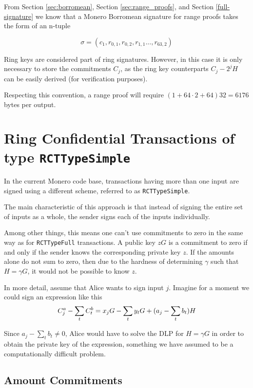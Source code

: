 From Section \ref{sec:borromean}, Section \ref{sec:range_proofs}, and Section \ref{full-signature} we know that a Monero Borromean signature for range proofs takes the form of an n-tuple

\[\sigma = (c_1, r_{0, 1}, r_{0, 2}, r_{1, 1}..., r_{63, 2} )  \]

Ring keys are considered part of ring signatures. However, in this case it is only necessary to store the commitments $C_j$, as the ring key counterparts $C_j - 2^j H$ can be easily derived (for verification purposes). 

Respecting this convention, a range proof will require \( ( 1 + 64 \cdot 2 + 64  ) 32 = 6176\) bytes per output.
\\


\section{ Ring Confidential Transactions of type {\tt RCTTypeSimple}}
\label{sec:RCTTypeSimple}

In the current Monero code base, transactions having more than one input are signed using a different scheme, referred to as {\tt RCTTypeSimple}.

The main characteristic of this approach is that instead of signing the entire set of inputs as a whole, the sender signs each of the inputs individually.

Among other things, this means one can’t use commitments to zero in the same way as for {\tt RCTTypeFull} transactions. A public key $z G$ is a commitment to zero if and only if the sender knows the corresponding private key $z$. If the amounts alone do not sum to zero, then due to the hardness of determining $\gamma$ such that $H = \gamma G$, it would not be possible to know $z$.

In more detail, assume that Alice wants to sign input $j$. Imagine for a moment we could sign an expression like this\\
\[  C^a_{j} - \sum\limits_t C^b_{t} \\
= x_j G -  \sum_t y_t G + (a_j - \sum\limits_t  b_t) H \]

Since \(a_j - \sum\limits_t  b_t \ne 0\), Alice would have to solve the DLP for \(H = \gamma G\) in order to obtain the private key of the expression, something we have assumed to be a computationally difficult problem.


\subsection{Amount Commitments}
\label{RCTTypeSimple-commitments}

